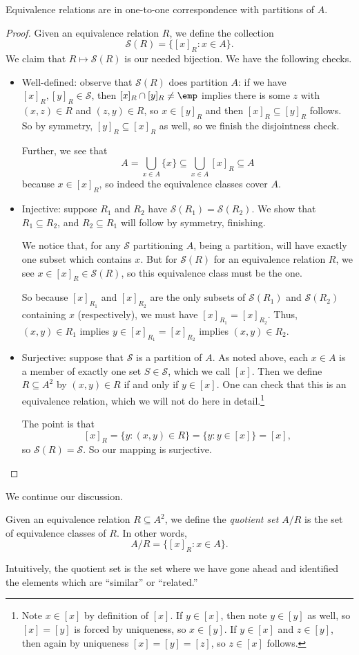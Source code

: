 \documentclass[../notes.tex]{subfiles}
\begin{document}
\begin{lemma}
	Equivalence relations are in one-to-one correspondence with partitions of $A$.
\end{lemma}
\begin{proof}
	Given an equivalence relation $R$, we define the collection
	\[\mathcal S(R)=\{[x]_R:x\in A\}.\]
	We claim that $R\mapsto\mathcal S(R)$ is our needed bijection. We have the following checks.
	\begin{itemize}
		\item Well-defined: observe that $\mathcal S(R)$ does partition $A$: if we have $[x]_R,[y]_R\in\mathcal S$, then $[x]_R\cap[y]_R\ne\emp$ implies there is some $z$ with $(x,z)\in R$ and $(z,y)\in R$, so $x\in[y]_R$ and then $[x]_R\subseteq[y]_R$ follows. So by symmetry, $[y]_R\subseteq[x]_R$ as well, so we finish the disjointness check.
	
		Further, we see that
		\[A=\bigcup_{x\in A}\{x\}\subseteq\bigcup_{x\in A}[x]_R\subseteq A\]
		because $x\in[x]_R$, so indeed the equivalence classes cover $A$.

		\item Injective: suppose $R_1$ and $R_2$ have $\mathcal S(R_1)=\mathcal S(R_2)$. We show that $R_1\subseteq R_2$, and $R_2\subseteq R_1$ will follow by symmetry, finishing.
		
		We notice that, for any $\mathcal S$ partitioning $A$, being a partition, will have exactly one subset which contains $x$. But for $\mathcal S(R)$ for an equivalence relation $R$, we see $x\in[x]_R\in\mathcal S(R)$, so this equivalence class must be the one.

		So because $[x]_{R_1}$ and $[x]_{R_2}$ are the only subsets of $\mathcal S(R_1)$ and $\mathcal S(R_2)$ containing $x$ (respectively), we must have $[x]_{R_1}=[x]_{R_2}$. Thus, $(x,y)\in R_1$ implies $y\in[x]_{R_1}=[x]_{R_2}$ implies $(x,y)\in R_2$.

		\item Surjective: suppose that $\mathcal S$ is a partition of $A$. As noted above, each $x\in A$ is a member of exactly one set $S\in\mathcal S$, which we call $[x]$. Then we define $R\subseteq A^2$ by $(x,y)\in R$ if and only if $y\in[x]$. One can check that this is an equivalence relation, which we will not do here in detail.\footnote{Note $x\in[x]$ by definition of $[x]$. If $y\in[x]$, then note $y\in[y]$ as well, so $[x]=[y]$ is forced by uniqueness, so $x\in[y]$. If $y\in[x]$ and $z\in[y]$, then again by uniqueness $[x]=[y]=[z]$, so $z\in[x]$ follows.}

		The point is that
		\[[x]_R=\{y:(x,y)\in R\}=\{y:y\in[x]\}=[x],\]
		so $\mathcal S(R)=\mathcal S$. So our mapping is surjective.
		\qedhere
	\end{itemize}
\end{proof}
We continue our discussion.
\begin{definition}
	Given an equivalence relation $R\subseteq A^2$, we define the \textit{quotient set $A/R$} is the set of equivalence classes of $R$. In other words,
	\[A/R=\{[x]_R:x\in A\}.\]
\end{definition}
Intuitively, the quotient set is the set where we have gone ahead and identified the elements which are ``similar'' or ``related.''
\end{document}
